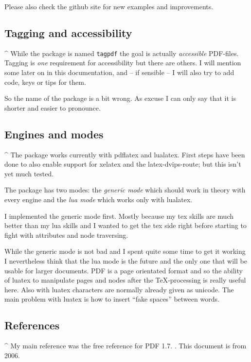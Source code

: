 \documentclass[DIV=12,parskip=half-,bibliography=totoc]{scrartcl}
\newcommand\PDF{PDF}
\begin{document}
\TagP Please also check the github site for new examples and improvements.
\TagPend

\subsection{Tagging and accessibility}

\TagP^ While the package is named \texttt{tagpdf} the goal is actually \emph{accessible} \PDF{}-files. Tagging is \emph{one} requirement for accessibility but there are others. I will mention some later on in this documentation, and -- if sensible -- I will also try to add code, keys or tips for them.

\TagP So the name of the package is a bit wrong. As excuse I can only say that it is shorter and easier to pronounce.
\TagPend

\subsection{Engines and modes}

\TagP^ The package works currently with pdflatex and lualatex. First steps have been done to also enable support for xelatex and the latex-dvips-route; but this isn't yet much tested.

\TagP The package has two modes: the \emph{generic mode} which should work in theory with every engine and the \emph{lua mode} which works only with lualatex.


\TagP I implemented the generic mode first. Mostly because my tex skills are much better than my lua skills and I wanted to get the tex side right before starting to fight with attributes and node traversing.

\TagP While the generic mode is not bad and I spent quite some time to get it working I nevertheless think that the lua mode is the future and the only one that will be usable for larger documents. \PDF{} is a page orientated format and so the ability of luatex to manipulate pages and nodes after the \TeX-processing is really useful here. Also with luatex characters are normally already given as unicode. The main problem with luatex is how to insert \enquote{fake spaces} between words.%
\TagPend



\subsection{References}

\TagP^ My main reference was the free reference for \PDF{} 1.7. \parencite{pdfreference}. This document is from 2006.
\end{document}
